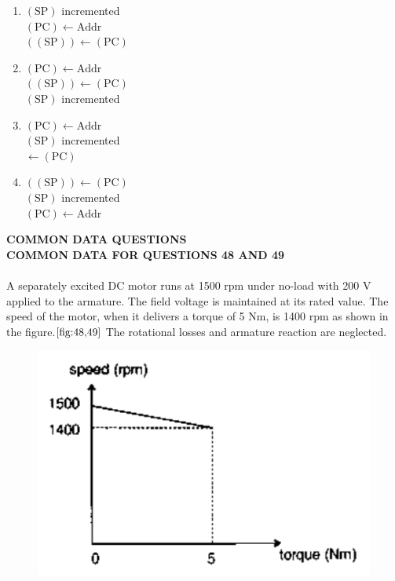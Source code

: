 \begin{multicols}{2}
\begin{enumerate}
    \item  
        
            $(\text{SP})$ incremented \\
            $(\text{PC}) \leftarrow \text{Addr}$ \\
            $((\text{SP})) \leftarrow (\text{PC})$ \\
        
    \item  
        
            $(\text{PC}) \leftarrow \text{Addr}$ \\
            $((\text{SP})) \leftarrow (\text{PC})$ \\
            $(\text{SP})$ incremented \\
        
    \item  
        
            $(\text{PC}) \leftarrow \text{Addr}$ \\
            $(\text{SP})$ incremented \\
            $\leftarrow (\text{PC})$ \\
        
    \item  
        
            $((\text{SP})) \leftarrow (\text{PC})$ \\
            $(\text{SP})$ incremented \\
            $(\text{PC}) \leftarrow \text{Addr}$ \\
\end{enumerate}
\end{multicols}
\textbf{COMMON DATA QUESTIONS}\\
\textbf{COMMON DATA FOR QUESTIONS 48 AND 49}\\\\
A separately excited DC motor runs at 1500 rpm under no-load with 200 V applied to the armature. The field voltage is maintained at its rated value. The speed of the motor, when it delivers a torque of 5 Nm, is 1400 rpm as shown in the figure.$\ref{fig:48,49}$ The rotational losses and armature reaction are neglected.
\begin{figure}[!ht]
    \centering
    \includegraphics[scale=0.4]{GATE-yearwise/GATE(3)/figs/48,49.png}
    \caption{}
    \label{fig:48,49}
\end{figure}
